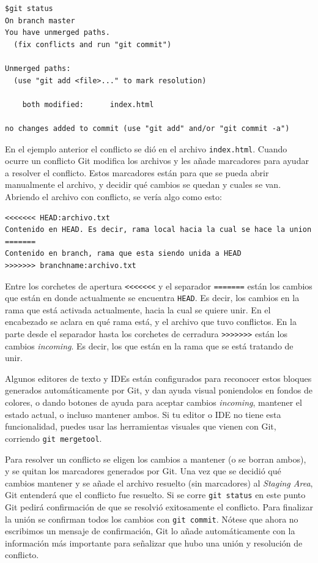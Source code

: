 \documentclass[spanish, 12pt, a4paper]{article}
\begin{document}
\begin{lstlisting}
$git status
On branch master
You have unmerged paths.
  (fix conflicts and run "git commit")

Unmerged paths:
  (use "git add <file>..." to mark resolution)

    both modified:      index.html

no changes added to commit (use "git add" and/or "git commit -a")
\end{lstlisting}

En el ejemplo anterior el conflicto se dió en el archivo
\passthrough{\lstinline!index.html!}. Cuando ocurre un conflicto Git
modifica los archivos y les añade marcadores para ayudar a resolver el
conflicto. Estos marcadores están para que se pueda abrir manualmente el
archivo, y decidir qué cambios se quedan y cuales se van. Abriendo el
archivo con conflicto, se vería algo como esto:

\begin{lstlisting}
<<<<<<< HEAD:archivo.txt
Contenido en HEAD. Es decir, rama local hacia la cual se hace la union
=======
Contenido en branch, rama que esta siendo unida a HEAD
>>>>>>> branchname:archivo.txt
\end{lstlisting}

Entre los corchetes de apertura \passthrough{\lstinline!<<<<<<<!} y el
separador \passthrough{\lstinline!=======!} están los cambios que están
en donde actualmente se encuentra \passthrough{\lstinline!HEAD!}. Es
decir, los cambios en la rama que está activada actualmente, hacia la
cual se quiere unir. En el encabezado se aclara en qué rama está, y el
archivo que tuvo conflictos. En la parte desde el separador hasta los
corchetes de cerradura \passthrough{\lstinline!>>>>>>>!} están los
cambios \emph{incoming}. Es decir, los que están en la rama que se está
tratando de unir.

Algunos editores de texto y IDEs están configurados para reconocer estos
bloques generados automáticamente por Git, y dan ayuda visual
poniendolos en fondos de colores, o dando botones de ayuda para aceptar
cambios \emph{incoming}, mantener el estado actual, o incluso mantener
ambos. Si tu editor o IDE no tiene esta funcionalidad, puedes usar las
herramientas visuales que vienen con Git, corriendo
\passthrough{\lstinline!git mergetool!}.

Para resolver un conflicto se eligen los cambios a mantener (o se borran
ambos), y se quitan los marcadores generados por Git. Una vez que se
decidió qué cambios mantener y se añade el archivo resuelto (sin
marcadores) al \emph{Staging Area}, Git entenderá que el conflicto fue
resuelto. Si se corre \passthrough{\lstinline!git status!} en este punto
Git pedirá confirmación de que se resolvió exitosamente el conflicto.
Para finalizar la unión se confirman todos los cambios con
\passthrough{\lstinline!git commit!}. Nótese que ahora no escribimos un
mensaje de confirmación, Git lo añade automáticamente con la información
más importante para señalizar que hubo una unión y resolución de
conflicto.
\end{document}

